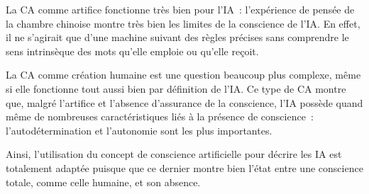 \documentclass[a4paper, titlepage, 12pt]{article}
\begin{document}
	La CA comme artifice fonctionne très bien pour l'IA~: l'expérience de pensée de la chambre chinoise montre très bien les limites de la conscience de l'IA. En effet, il ne s'agirait que d'une machine suivant des règles précises sans comprendre le sens intrinsèque des mots qu'elle emploie ou qu'elle reçoit.

	La CA comme création humaine est une question beaucoup plus complexe, même si elle fonctionne tout aussi bien par définition de l'IA. Ce type de CA montre que, malgré l'artifice et l'absence d'assurance de la conscience, l'IA possède quand même de nombreuses caractéristiques liés à la présence de conscience~: l'autodétermination et l'autonomie sont les plus importantes.

	Ainsi, l'utilisation du concept de conscience artificielle pour décrire les IA est totalement adaptée puisque que ce dernier montre bien l'état entre une conscience totale, comme celle humaine, et son absence.
	
	
\end{document}
